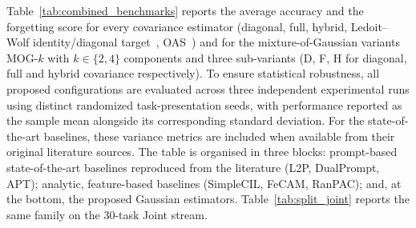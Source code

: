 \label{sec:covariance_results}
Table~\ref{tab:combined_benchmarks} reports the average accuracy and the forgetting score for every covariance estimator (diagonal, full, hybrid, Ledoit--Wolf identity/diagonal target~\cite{Ledoit2004}, OAS~\cite{Chen2010}) and for the mixture-of-Gaussian variants MOG-$k$ with $k\in\{2,4\}$ components and three sub-variants (D, F, H for diagonal, full and hybrid covariance respectively). 
To ensure statistical robustness, all proposed configurations are evaluated across three independent experimental runs using distinct randomized task-presentation seeds, with performance reported as the sample mean alongside its corresponding standard deviation. For the state-of-the-art baselines, these variance metrics are included when available from their original literature sources.
The table is organised in three blocks: prompt-based state-of-the-art baselines reproduced from the literature (L2P, DualPrompt, APT); analytic, feature-based baselines (SimpleCIL, FeCAM, RanPAC); and, at the bottom, the proposed Gaussian estimators. Table~\ref{tab:split_joint} reports the same family on the 30-task Joint stream.


